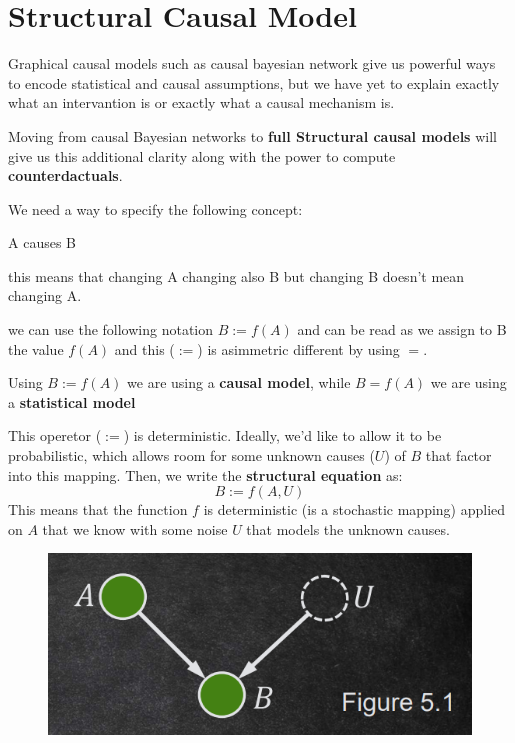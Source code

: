 \chapter{Structural Causal Model}
Graphical causal models such as causal bayesian network give us powerful ways to encode 
statistical and causal assumptions, but we have yet to explain exactly what an intervantion
is or exactly what a causal mechanism is.

Moving from causal Bayesian networks to \textbf{full Structural causal models} will give 
us this additional clarity along with the power to compute \textbf{counterdactuals}.

We need a way to specify the following concept:
\begin{center}
    A causes B
\end{center}

this means that changing A changing also B but changing B doesn't mean changing A.

we can use the following notation $B := f(A)$ and can be read as we assign to B the 
value $f(A)$ and this ($:=$) is asimmetric different by using $=$.  

\begin{note}
    Using $B := f(A)$ we are using a \textbf{causal model}, while $B = f(A)$ we 
    are using a \textbf{statistical model}
\end{note}

This operetor ($:=$) is deterministic. Ideally, we'd like to allow it to be 
probabilistic, which allows room for some unknown causes ($U$) of $B$ that factor into 
this mapping. Then, we write the \textbf{structural equation} as:
\begin{equation}
    B := f(A, U)
\end{equation}
This means that the function $f$ is deterministic (is a stochastic mapping) applied on
$A$ that we know with some noise $U$ that models the unknown causes.

\begin{figure}[h]
    \centering
    \includegraphics*[width=0.7 \textwidth]{img/uknown_graphs.png}
\end{figure}

